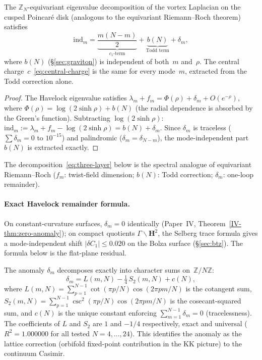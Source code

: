 \begin{proposition}
\label{prop:equiv-rr}
The $\mathbb{Z}_N$-equivariant eigenvalue decomposition
of the vortex Laplacian on the cusped Poincar\'e disk
(analogous to the equivariant Riemann--Roch theorem) satisfies
\begin{equation}\label{eq:equiv-rr}
  \mathrm{ind}_m = \underbrace{\frac{m(N{-}m)}{2}}_{c_1\text{-term}}
    + \underbrace{b(N)}_{\text{Todd term}}
    + \delta_m,
\end{equation}
where $b(N)$ (\S\ref{sec:graviton}) is independent of
both~$m$ and~$\rho$.
The central charge~$c$~\eqref{eq:central-charge} is the same
for every mode~$m$, extracted from the Todd correction alone.
\end{proposition}

\begin{proof}
The Havelock eigenvalue satisfies $\lambda_m + f_m = \Phi(\rho) + \delta_m + O(e^{-\rho})$,
where $\Phi(\rho) = \log(2\sinh\rho) + b(N)$ (the radial
dependence is absorbed by the Green's function).
Subtracting $\log(2\sinh\rho)$:
$\mathrm{ind}_m := \lambda_m + f_m - \log(2\sinh\rho) = b(N) + \delta_m$.
Since $\delta_m$ is traceless ($\sum\delta_m = 0$ to $10^{-15}$)
and palindromic ($\delta_m = \delta_{N-m}$), the mode-independent
part $b(N)$ is extracted exactly.
\end{proof}

\noindent
The decomposition~\eqref{eq:three-layer} below is the spectral
analogue of equivariant Riemann--Roch
($f_m$: twist-field dimension; $b(N)$: Todd correction;
$\delta_m$: one-loop remainder).

\paragraph{Exact Havelock remainder formula.}
On constant-curvature surfaces, $\delta_m = 0$ identically
(Paper~IV, Theorem~\ref*{IV-thm:zero-anomaly});
on compact quotients $\Gamma\backslash\mathbf{H}^2$,
the Selberg trace formula gives a mode-independent shift
$|\delta C_1| \le 0.020$ on the Bolza surface
(\S\ref{sec:btz}).
The formula below is the flat-plane residual.

\noindent
The anomaly $\delta_m$ decomposes exactly into character sums
on~$\mathbb{Z}/N\mathbb{Z}$:
\begin{equation}\label{eq:weyl-exact}
  \delta_m = L(m,N) - \tfrac{1}{4}\,S_2(m,N) + c(N),
\end{equation}
where $L(m,N) = \sum_{p=1}^{N-1}\cot(\pi p/N)\cos(2\pi pm/N)$
is the cotangent sum,
$S_2(m,N) = \sum_{p=1}^{N-1}\csc^2(\pi p/N)\cos(2\pi pm/N)$
is the cosecant-squared sum, and $c(N)$ is the unique constant
enforcing $\sum_{m=1}^{N-1}\delta_m = 0$ (tracelessness).
The coefficients of $L$ and $S_2$ are $1$ and $-1/4$ respectively, exact and universal
($R^2 = 1.000000$ for all tested $N = 4,\ldots,24$).
This identifies the anomaly as the lattice correction
(orbifold fixed-point contribution in the KK picture)
to the continuum Casimir.

